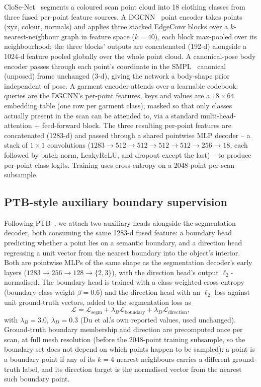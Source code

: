 \documentclass{article}
\theoremstyle{plain}
\theoremstyle{definition}
\theoremstyle{remark}
\begin{document}
CloSe-Net~\cite{antic2024close} segments a coloured scan point cloud into 18
clothing classes from three fused per-point feature sources. A
DGCNN~\cite{wang2019dynamicgraphcnnlearning} point encoder takes points (xyz,
colour, normals) and applies three stacked EdgeConv blocks over a
$k$-nearest-neighbour graph in feature space ($k{=}40$), each block
max-pooled over its neighbourhood; the three blocks' outputs are concatenated
(192-d) alongside a 1024-d feature pooled globally over the whole point cloud.
A canonical-pose body encoder passes through each point's coordinate in the
SMPL~\cite{SMPL:2015} canonical (unposed) frame unchanged (3-d), giving the
network a body-shape prior independent of pose. A garment encoder attends
over a learnable codebook: queries are the DGCNN's per-point features, keys
and values are a $18\times64$ embedding table (one row per garment class),
masked so that only classes actually present in the scan can be attended to,
via a standard multi-head-attention $+$ feed-forward block. The three
resulting per-point features are concatenated (1283-d) and passed through a
shared pointwise MLP decoder -- a stack of $1{\times}1$ convolutions
($1283\rightarrow512\rightarrow512\rightarrow512\rightarrow512\rightarrow256\rightarrow18$,
each followed by batch norm, LeakyReLU, and dropout except the last) -- to
produce per-point class logits. Training uses cross-entropy on a 2048-point
per-scan subsample.

\subsection{PTB-style auxiliary boundary supervision}
\label{sec:methodology:ptb}

Following PTB~\cite{Du_2022}, we attach two auxiliary heads alongside the
segmentation decoder, both consuming the same 1283-d fused feature: a
boundary head predicting whether a point lies on a semantic boundary, and a
direction head regressing a unit vector from the nearest boundary into the
object's interior. Both are pointwise MLPs of the same shape as the
segmentation decoder's early layers ($1283\rightarrow256\rightarrow128\rightarrow\{2,3\}$),
with the direction head's output $\ell_2$-normalised. The boundary head is
trained with a class-weighted cross-entropy (boundary-class weight
$\beta{=}0.6$) and the direction head with an $\ell_2$ loss against unit
ground-truth vectors, added to the segmentation loss as
\begin{equation}
  \mathcal{L} = \mathcal{L}_{\text{segm}} + \lambda_B \mathcal{L}_{\text{boundary}} + \lambda_D \mathcal{L}_{\text{direction}},
  \label{eq:ptb-loss}
\end{equation}
with $\lambda_B{=}3.0$, $\lambda_D{=}0.3$ (Du et al.'s own reported values, used
unchanged). Ground-truth boundary membership
and direction are precomputed once per scan, at full mesh resolution (before
the 2048-point training subsample, so the boundary set does not depend on
which points happen to be sampled): a point is a boundary point if any of its
$k{=}4$ nearest neighbours carries a different ground-truth label, and its
direction target is the normalised vector from the nearest such boundary
point.
\end{document}
